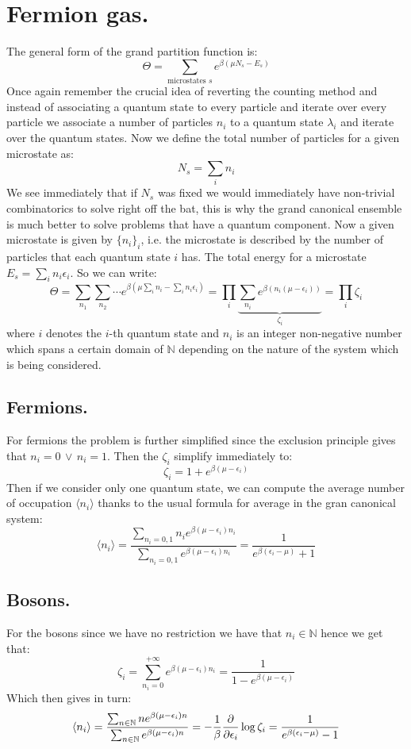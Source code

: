 \documentclass[10pt,a4paper]{book}
\begin{document}
\section{Fermion gas.}
The general form of the grand partition function is:
\[
\Theta = \sum_{\text{microstates } s} e^{\beta(\mu N_s - E_s)}
\]
Once again remember the crucial idea of reverting the counting method and instead of associating a quantum state to every particle and iterate over every particle we associate a number of particles $n_i$ to a quantum state $\lambda_i$ and iterate over the quantum states. Now we define the total number of particles for a given microstate as:
\[
N_s = \sum_{i} n_i
\]
We see immediately that if $N_s$ was fixed we would immediately have non-trivial combinatorics to solve right off the bat, this is why the grand canonical ensemble is much better to solve problems that have a quantum component. Now a given microstate is given by $\{n_i\}_i$, i.e. the microstate is described by the number of particles that each quantum state $i$ has. The total energy for a microstate $E_s=\sum_i n_i\epsilon_i$. So we can write:
\[
\Theta = \sum_{n_1} \sum_{n_2} \cdots e^{\beta (\mu \sum_i n_i - \sum_i n_i \epsilon_i)} = \prod_i \underbrace{\sum_{n_i} e^{\beta (n_i (\mu - \epsilon_i))}}_{\zeta_i}=\prod_i\zeta_i
\]
where $i$ denotes the $i$-th quantum state and $n_i$ is an integer non-negative number which spans a certain domain of $\mathbb{N}$ depending on the nature of the system which is being considered.

\subsection{Fermions.}
For fermions the problem is further simplified since the exclusion principle  gives that $n_i = 0\, \lor\, n_i = 1$. Then the $\zeta_i$ simplify immediately to:
\[
\zeta_i = 1 + e^{\beta(\mu - \epsilon_i)}
\]
Then if we consider only one quantum state, we can compute the average number of occupation $\langle n_i\rangle$ thanks to the usual formula for average in the gran canonical system:
\[
\langle n_i \rangle = \frac{\sum_{n_i = 0, 1} n_i e^{\beta(\mu - \epsilon_i)n_i}}{\sum_{n_i = 0, 1} e^{\beta(\mu - \epsilon_i)n_i}} = \frac{1}{e^{\beta(\epsilon_i - \mu)} + 1}
\]
\subsection{Bosons.}
For the bosons since we have no restriction we have that $n_i \in \mathbb{N}$ hence we get that:
\[
\zeta_i = \sum_{n_i = 0}^{+\infty} e^{\beta(\mu - \epsilon_i)n_i} = \frac{1}{1 - e^{\beta(\mu - \epsilon_i)}}
\]
Which then gives in turn:
\[
\langle n_i \rangle  =\frac{\sum_{n\in\mathbb{N}} ne^{\beta(\mu-\epsilon_i)n}}{\sum_{n\in\mathbb{N}} e^{\beta(\mu-\epsilon_i)n}}= - \frac{1}{\beta} \pdv{}{\epsilon_i} \log \zeta_i = \frac{1}{e^{\beta(\epsilon_i - \mu)} - 1}
\]
\end{document}
